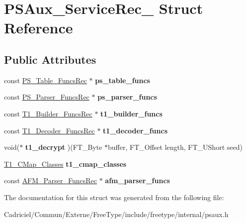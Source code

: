 \hypertarget{struct_p_s_aux___service_rec__}{\section{P\-S\-Aux\-\_\-\-Service\-Rec\-\_\- Struct Reference}
\label{struct_p_s_aux___service_rec__}
}
\subsection*{Public Attributes}
\begin{DoxyCompactItemize}
\item 
\hypertarget{struct_p_s_aux___service_rec___ad328bf7394cad5b2838822aa109acc42}{const \hyperlink{struct_p_s___table___funcs_rec__}{P\-S\-\_\-\-Table\-\_\-\-Funcs\-Rec} $\ast$ {\bfseries ps\-\_\-table\-\_\-funcs}}\label{struct_p_s_aux___service_rec___ad328bf7394cad5b2838822aa109acc42}

\item 
\hypertarget{struct_p_s_aux___service_rec___ac673695e814332b38fd33c7f0287a4b7}{const \hyperlink{struct_p_s___parser___funcs_rec__}{P\-S\-\_\-\-Parser\-\_\-\-Funcs\-Rec} $\ast$ {\bfseries ps\-\_\-parser\-\_\-funcs}}\label{struct_p_s_aux___service_rec___ac673695e814332b38fd33c7f0287a4b7}

\item 
\hypertarget{struct_p_s_aux___service_rec___a3fe7449b123d0fb6f7ba92462c4e94c1}{const \hyperlink{struct_t1___builder___funcs_rec__}{T1\-\_\-\-Builder\-\_\-\-Funcs\-Rec} $\ast$ {\bfseries t1\-\_\-builder\-\_\-funcs}}\label{struct_p_s_aux___service_rec___a3fe7449b123d0fb6f7ba92462c4e94c1}

\item 
\hypertarget{struct_p_s_aux___service_rec___a5cfe03f55fa4c342a094fd31355835b2}{const \hyperlink{struct_t1___decoder___funcs_rec__}{T1\-\_\-\-Decoder\-\_\-\-Funcs\-Rec} $\ast$ {\bfseries t1\-\_\-decoder\-\_\-funcs}}\label{struct_p_s_aux___service_rec___a5cfe03f55fa4c342a094fd31355835b2}

\item 
\hypertarget{struct_p_s_aux___service_rec___a908d3ea91a5c313015bc90568026d57c}{void($\ast$ {\bfseries t1\-\_\-decrypt} )(F\-T\-\_\-\-Byte $\ast$buffer, F\-T\-\_\-\-Offset length, F\-T\-\_\-\-U\-Short seed)}\label{struct_p_s_aux___service_rec___a908d3ea91a5c313015bc90568026d57c}

\item 
\hypertarget{struct_p_s_aux___service_rec___a4ac30b929dcc6127200baea07b5b406a}{\hyperlink{struct_t1___c_map___classes_rec__}{T1\-\_\-\-C\-Map\-\_\-\-Classes} {\bfseries t1\-\_\-cmap\-\_\-classes}}\label{struct_p_s_aux___service_rec___a4ac30b929dcc6127200baea07b5b406a}

\item 
\hypertarget{struct_p_s_aux___service_rec___a9ddf18cc18487266a3e1dd7721fd12fb}{const \hyperlink{struct_a_f_m___parser___funcs_rec__}{A\-F\-M\-\_\-\-Parser\-\_\-\-Funcs\-Rec} $\ast$ {\bfseries afm\-\_\-parser\-\_\-funcs}}\label{struct_p_s_aux___service_rec___a9ddf18cc18487266a3e1dd7721fd12fb}

\end{DoxyCompactItemize}


The documentation for this struct was generated from the following file\-:\begin{DoxyCompactItemize}
\item 
Cadriciel/\-Commun/\-Externe/\-Free\-Type/include/freetype/internal/psaux.\-h\end{DoxyCompactItemize}

